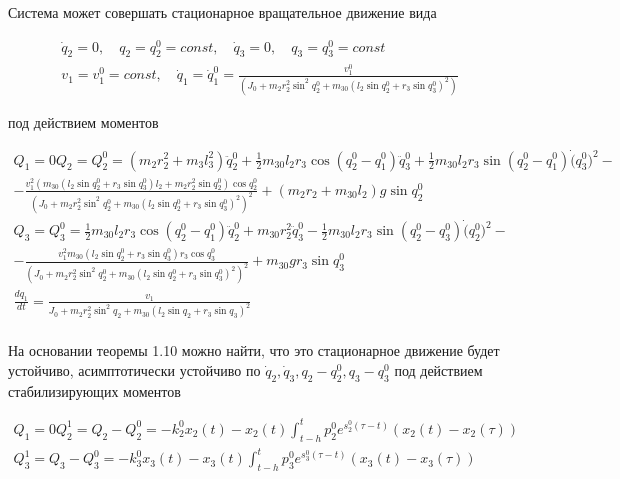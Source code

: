   Система может совершать стационарное вращательное движение вида 
  
  \begin{equation*}
  \begin{array}{c}
  \displaystyle \dot q_2 = 0, \quad q_2 = q_2^0 = const, \quad \dot q_3 = 0, \quad q_3 = q_3^0 = const \\
  \displaystyle v_1 = v_1^0 = const, \quad \dot q_1 = \dot q_1^0 = \frac{v_1^0}{(J_0 + m_2 r_2^2 \sin^2 q_2^0 + m_{30} (l_2 \sin q_2^0 + r_3 \sin q_3^0)^2)}
  \end{array}
  \end{equation*} 
  
  под действием моментов
  
  \begin{equation*}
  \begin{array}{l}
  \displaystyle Q_1 = 0
  \displaystyle Q_2 = Q_2^0 = (m_2 r_2^2 + m_3 l_3^2) \ddot q_2^0 + \frac12 m_{30} l_2 r_3 \cos(q_2^0 - q_1^0) \ddot q_3^0 + \frac12 m_{30} l_2 r_3 \sin(q_2^0 - q_1^0) \dot (q_3^0)^2 - \\ 
  \displaystyle - \frac{v_1^2 (m_{30} (l_2 \sin q_2^0 + r_3 \sin q_3^0) l_2 + m_2 r_2^2 \sin q_2^0) \cos q_2^0}{(J_0 + m_2 r_2^2 \sin^2 q_2^0 + m_{30} (l_2 \sin q_2^0 + r_3 \sin q_3^0)^2)^2} + (m_2 r_2 + m_{30} l_2) g \sin q_2^0\\
  \displaystyle Q_3 = Q_3^0 = \frac12 m_{30} l_2 r_3 \cos (q_2^0 - q_1^0) \ddot q_2^0 + m_{30} r_2^2 \ddot q_3^0 - \frac12 m_{30} l_2 r_3 \sin(q_2^0 - q_3^0) \dot (q_2^0)^2 - \\ 
  \displaystyle - \frac{v_1^2 m_{30} (l_2 \sin q_2^0 + r_3 \sin q_3^0) r_3 \cos q_3^0}{(J_0 + m_2 r_2^2 \sin^2 q_2^0 + m_{30} (l_2 \sin q_2^0 + r_3 \sin q_3^0)^2)^2} + m_{30} g r_3 \sin q_3^0\\
  \displaystyle \frac{d q_1}{d t} = \frac{v_1}{J_0 + m_2 r_2^2 \sin^2 q_2 + m_{30} (l_2 \sin q_2 + r_3 \sin q_3)^2} \\
  \end{array}
  \end{equation*}
  
  На основании теоремы 1.10 можно найти, что это стационарное движение будет устойчиво, асимптотически устойчиво по $\dot q_2, \dot q_3, q_2 - q_2^0, q_3 - q_3^0$ под действием стабилизирующих моментов 
 
   \begin{equation*}
   \begin{array}{l}
   \displaystyle Q_1 = 0
   \displaystyle Q_2^1 = Q_2 - Q_2^0 = - k_2^0 x_2(t) - x_2(t) \int_{t-h}^{t} p_2^0 e^{s_2^0 (\tau - t)} (x_2(t) - x_2(\tau))\\
   \displaystyle Q_3^1 = Q_3 - Q_3^0 = - k_3^0 x_3(t) - x_3(t) \int_{t-h}^{t} p_3^0 e^{s_3^0 (\tau - t)} (x_3(t) - x_3(\tau))\\
   \end{array}
   \end{equation*}
   

